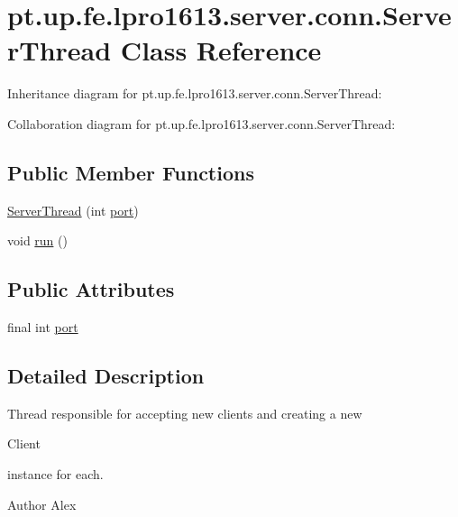 \hypertarget{classpt_1_1up_1_1fe_1_1lpro1613_1_1server_1_1conn_1_1_server_thread}{}\section{pt.\+up.\+fe.\+lpro1613.\+server.\+conn.\+Server\+Thread Class Reference}
\label{classpt_1_1up_1_1fe_1_1lpro1613_1_1server_1_1conn_1_1_server_thread}


Inheritance diagram for pt.\+up.\+fe.\+lpro1613.\+server.\+conn.\+Server\+Thread\+:


Collaboration diagram for pt.\+up.\+fe.\+lpro1613.\+server.\+conn.\+Server\+Thread\+:
\subsection*{Public Member Functions}
\begin{DoxyCompactItemize}
\item 
\hyperlink{classpt_1_1up_1_1fe_1_1lpro1613_1_1server_1_1conn_1_1_server_thread_a2a2c941ac08b8354d3c5ffa721372244}{Server\+Thread} (int \hyperlink{classpt_1_1up_1_1fe_1_1lpro1613_1_1server_1_1conn_1_1_server_thread_a89129be61d7282900277bab472083325}{port})
\item 
void \hyperlink{classpt_1_1up_1_1fe_1_1lpro1613_1_1server_1_1conn_1_1_server_thread_a78326abfc2bd35d8d4d3ac214ed3056c}{run} ()
\end{DoxyCompactItemize}
\subsection*{Public Attributes}
\begin{DoxyCompactItemize}
\item 
final int \hyperlink{classpt_1_1up_1_1fe_1_1lpro1613_1_1server_1_1conn_1_1_server_thread_a89129be61d7282900277bab472083325}{port}
\end{DoxyCompactItemize}


\subsection{Detailed Description}
Thread responsible for accepting new clients and creating a new 
\begin{DoxyCode}
Client 
\end{DoxyCode}
 instance for each.

\begin{DoxyAuthor}{Author}
Alex 
\end{DoxyAuthor}



